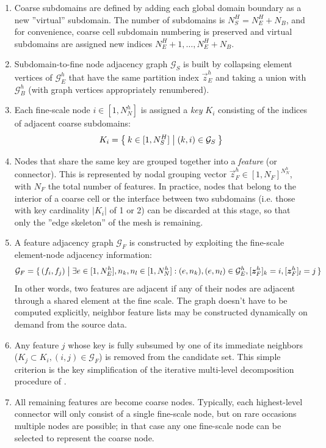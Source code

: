 \begin{enumerate}
    \item Coarse subdomains are defined by adding each global domain boundary as a new ''virtual'' subdomain.   The number of subdomains is $N_S^H = N_E^H + N_B$, and for convenience, coarse cell subdomain numbering is preserved and virtual subdomains are assigned new indices $N_E^H+1,\ldots,N_E^H+N_B$.
    \item Subdomain-to-fine node adjacency graph $\mathcal{G}_S$ is built by collapsing element vertices of $\mathcal{G}_E^h$ that have the same partition index $\vec{z}_E^h$ and taking a union with $\mathcal{G}_B^h$ (with graph vertices appropriately renumbered). 
    \item Each fine-scale node $i \in [1,N_N^h]$ is assigned a \textit{key} $K_i$ consisting of the indices of adjacent coarse subdomains:
    \begin{align}
        K_i = \Set{ k \in [1,N_S^H] \bigm| (k,i) \in \mathcal{G}_S }
    \end{align}
    \item Nodes that share the same key are grouped together into a \textit{feature} (or connector).   This is represented by nodal grouping vector $\vec{z}_F^h \in [1,N_F]^{N_N^h}$, with $N_F$ the total number of features.   In practice, nodes that belong to the interior of a coarse cell or the interface between two subdomains (i.e. those with key cardinality $|K_i|$ of 1 or 2) can be discarded at this stage, so that only the ''edge skeleton'' of the mesh is remaining.
    \item A feature adjacency graph $\mathcal{G}_F$ is constructed by exploiting the fine-scale element-node adjacency information:
    \begin{align}
        \mathcal{G}_F = \set{(f_i,f_j) \bigm| \exists e \in [1,N_E^h], n_k, n_l \in [1,N_N^h]: (e,n_k), (e,n_l) \in \mathcal{G}_E^h, [\bm{z}_F^h]_k = i, [\bm{z}_F^h]_l = j}
    \end{align}
    In other words, two features are adjacent if any of their nodes are adjacent through a shared element at the fine scale.   The graph doesn't have to be computed explicitly, neighbor feature lists may be constructed dynamically on demand from the source data.
    \item Any feature $j$ whose key is fully subsumed by one of its immediate neighbors ($K_j \subset K_i, (i,j) \in \mathcal{G}_F$) is removed from the candidate set.   This simple criterion is the key simplification of the iterative multi-level decomposition procedure of \cite{Henon2006}.
    \item All remaining features are become coarse nodes.   Typically, each highest-level connector will only consist of a single fine-scale node, but on rare occasions multiple nodes are possible; in that case any one fine-scale node can be selected to represent the coarse node.
\end{enumerate}

